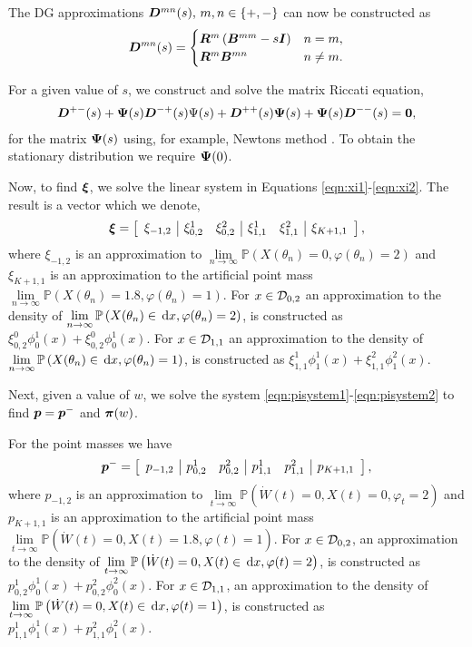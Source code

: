 The DG approximations \(  \boldsymbol D^{m n}(s),\, m,n\in\{+,-\}\) can now be constructed as 
\[  \boldsymbol D^{m n}(s) = \begin{cases}   \boldsymbol R^m\left({  \boldsymbol B}^{mm} - s \boldsymbol I\right) & n=m,
	\\   \boldsymbol R^m {  \boldsymbol B}^{mn} & n \neq m. \end{cases}\]

For a given value of \(s\), we construct and solve the matrix Riccati equation,
\begin{align*}
	\boldsymbol D^{+-}(s)
+ \boldsymbol \Psi(s)   \boldsymbol D^{-+}(s)\Psi(s)
+   \boldsymbol D^{++}(s)\boldsymbol \Psi(s)
+ \boldsymbol \Psi(s)  \boldsymbol D^{--}(s)
= \boldsymbol 0,
\end{align*}
for the matrix \(\boldsymbol \Psi(s)\) using, for example, Newtons method \citep{bot08}. To obtain the stationary distribution we require \(\boldsymbol \Psi(0)\). 

Now, to find \( {\boldsymbol\xi}\), we solve the linear system in Equations \eqref{eqn:xi1}-\eqref{eqn:xi2}. The result is a vector which we denote, 
\[ {\boldsymbol\xi} = \left[\begin{array}{c|cc|cc|c} {\xi}_{-1,2} &  {\xi}_{0,2}^1 &  {\xi}_{0,2}^2 &  {\xi}_{1,1}^1 &  {\xi}_{1,1}^2 &  {\xi}_{K+1,1} \end{array}\right],\]
where \( {\xi}_{-1,2}\) is an approximation to \( \lim\limits_{n\to\infty}\mathbb{P}\left( X{(\theta_n)} =0, \varphi({\theta_n}) = 2\right)\) and \( {\xi}_{K+1,1}\) is an approximation to the artificial point mass \( \lim\limits_{n\to\infty}\mathbb{P}\left( X({\theta_n}) =1.8, \varphi({\theta_n}) = 1\right)\). For \(x\in\mathcal{D}_{0,2}\) an approximation to the density of \( \lim\limits_{n\to\infty}\mathbb{P}\left( X({\theta_n}) \in \, \mathrm{d} x, \varphi({\theta_n}) = 2\right)\), is constructed as \( {\xi}_{0,2}^0\phi_0^1(x) +  {\xi}_{0,2}^0\phi_0^1(x)\). For \(x\in\mathcal{D}_{1,1}\) an approximation to the density of \( \lim\limits_{n\to\infty}\mathbb{P}\left(X({\theta_n}) \in \, \mathrm{d} x, \varphi({\theta_n}) = 1\right)\), is constructed as \( {\xi}_{1,1}^1\phi_1^1(x) +  {\xi}_{1,1}^2\phi_1^2(x).\)

Next, given a value of \(w\), we solve the system \eqref{eqn:pisystem1}-\eqref{eqn:pisystem2} to find \( {\boldsymbol p}= {\boldsymbol p}^-\) and \( {\boldsymbol \pi}(w)\). 

For the point masses we have 
\[ {\boldsymbol p}^- = \left[\begin{array}{c|cc|cc|c} {p}_{-1,2} &  {p}_{0,2}^1 &  {p}_{0,2}^2 &  {p}_{1,1}^1 &  {p}_{1,1}^2 &  {p}_{K+1,1} \end{array}\right],\]
where \( {p}_{-1,2}\) is an approximation to \( \lim\limits_{t\to\infty}\mathbb{P}\left(\dot W(t)=0,X({t}) =0, \varphi_{t} = 2\right)\) and \( {p}_{K+1,1}\) is an approximation to the artificial point mass \( \lim\limits_{t\to\infty}\mathbb{P}\left(\dot W(t)=0, X(t) =1.8, \varphi({t}) = 1\right)\). For \(x\in\mathcal{D}_{0,2}\), an approximation to the density of \( \lim\limits_{t\to\infty}\mathbb{P}\left( \dot W(t)=0, X(t) \in \, \mathrm{d} x, \varphi({t}) = 2\right)\), is constructed as \( {p}_{0,2}^1\phi_0^1(x) +  {p}_{0,2}^2\phi_0^2(x)\). For \(x\in\mathcal{D}_{1,1}\), an approximation to the density of \( \lim\limits_{t\to\infty}\mathbb{P}\left(\dot W(t)=0, X(t) \in \, \mathrm{d} x, \varphi({t}) = 1\right)\), is constructed as \( {p}_{1,1}^1\phi_1^1(x) +  {p}_{1,1}^2\phi_1^2(x).\)

